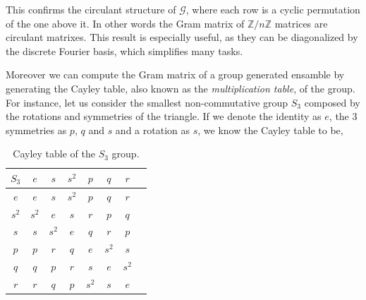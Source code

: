 \documentclass[12pt,letterpaper]{article}
\begin{document}
\begin{multicols}{2}
This confirms the circulant structure of $\mathcal{G}$, where each row is a cyclic permutation of the one above it. In other words the Gram matrix of $\mathbb{Z}/n\mathbb{Z}$ matrices are circulant matrixes. This result is especially useful, as they can be diagonalized by the discrete Fourier basis, which simplifies many tasks\cite{circulantMatrices}.

Moreover we can compute the Gram matrix of a group generated ensamble by generating the Cayley table, also known as the \emph{multiplication table}, of the group. For instance, let us consider the smallest non-commutative group $S_3$ composed by the rotations and symmetries of the triangle. If we denote the identity as $e$, the 3 symmetries as $p$, $q$ and $s$ and a rotation as $s$, we know the Cayley table to be,
\begin{table}[H]
	\centering
	\caption{Cayley table of the $S_3$ group.}
	\begin{tabular}{c||c c c c c c c}
        $S_3$ & $e$ & $s$ & $s^2$ & $p$ & $q$ & $r$ \\\hline\hline
        $e$   & $e$ & $s$ & $s^2$ & $p$ & $q$ & $r$ \\
        $s^2$ & $s^2$ & $e$ & $s$ & $r$ & $p$ & $q$ \\
        $s$   & $s$ & $s^2$ & $e$ & $q$ & $r$ & $p$ \\
        $p$ & $p$ & $r$ & $q$ & $e$ & $s^2$ & $s$ \\
        $q$ & $q$ & $p$ & $r$ & $s$ & $e$ & $s^2$ \\
        $r$ & $r$ & $q$ & $p$ & $s^2$ & $s$ & $e$
    \end{tabular}
\end{table}


\end{multicols}
\end{document}
